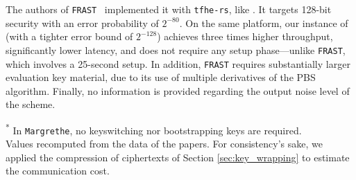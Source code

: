 The authors of \texttt{FRAST}~\cite{ToSC:CCHLOS24} implemented it with \texttt{tfhe-rs}, like \coolName. It targets 128-bit security with an error probability of $2^{-80}$. On the same platform, our instance of \coolName (with a tighter error bound of $2^{-128}$) achieves three times higher throughput, significantly lower latency, and does not require any setup phase—unlike \texttt{FRAST}, which involves a 25-second setup. In addition, \texttt{FRAST} requires substantially larger evaluation key material, due to its use of multiple derivatives of the PBS algorithm. Finally, no information is provided regarding the output noise level of the scheme.



\begin{table}[t!]
	\centering
	\caption{Performance of state-of-the-art TFHE-friendly ciphers (single-threaded when applicable). Communication cost accounts for both the encrypted symmetric key and the evaluation keys. \label{tab:comparisons_soa}}
	\begin{minipage}{\linewidth}
		\footnotesize\textsuperscript{*} In \texttt{Margrethe}, no keyswitching nor bootstrapping keys are required.\\
		\label{fn:margrethe_keysize}
		\footnotesize\textsuperscript{\dag} Values recomputed from the data of the papers. For consistency's sake, we applied the compression of ciphertexts of Section \ref{sec:key_wrapping} to estimate the communication cost.
		\label{fn:comm-cost}
	\end{minipage}
\end{table}


